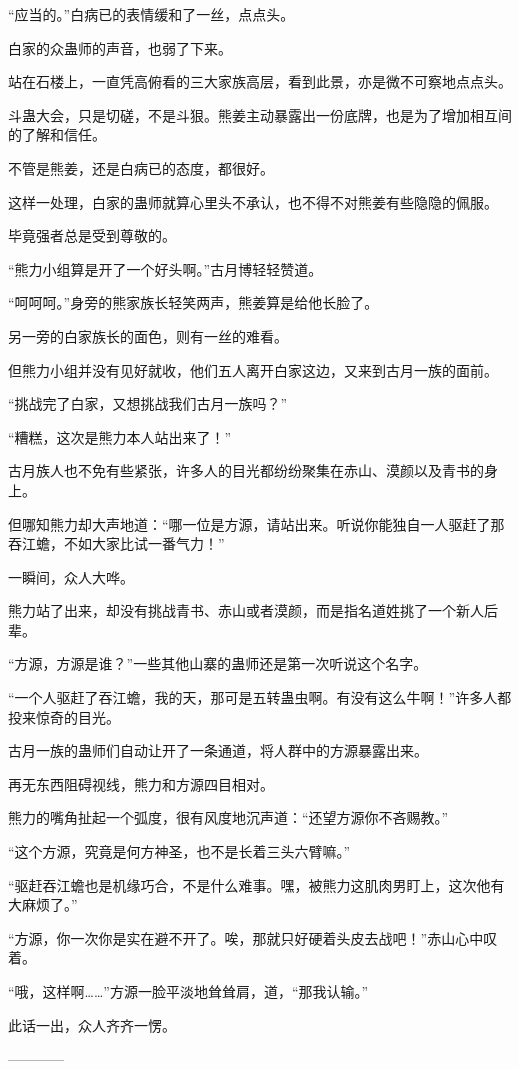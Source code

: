 \begin{this_body}
“应当的。”白病已的表情缓和了一丝，点点头。

白家的众蛊师的声音，也弱了下来。

站在石楼上，一直凭高俯看的三大家族高层，看到此景，亦是微不可察地点点头。

斗蛊大会，只是切磋，不是斗狠。熊姜主动暴露出一份底牌，也是为了增加相互间的了解和信任。

不管是熊姜，还是白病已的态度，都很好。

这样一处理，白家的蛊师就算心里头不承认，也不得不对熊姜有些隐隐的佩服。

毕竟强者总是受到尊敬的。

“熊力小组算是开了一个好头啊。”古月博轻轻赞道。

“呵呵呵。”身旁的熊家族长轻笑两声，熊姜算是给他长脸了。

另一旁的白家族长的面色，则有一丝的难看。

但熊力小组并没有见好就收，他们五人离开白家这边，又来到古月一族的面前。

“挑战完了白家，又想挑战我们古月一族吗？”

“糟糕，这次是熊力本人站出来了！”

古月族人也不免有些紧张，许多人的目光都纷纷聚集在赤山、漠颜以及青书的身上。

但哪知熊力却大声地道：“哪一位是方源，请站出来。听说你能独自一人驱赶了那吞江蟾，不如大家比试一番气力！”

一瞬间，众人大哗。

熊力站了出来，却没有挑战青书、赤山或者漠颜，而是指名道姓挑了一个新人后辈。

“方源，方源是谁？”一些其他山寨的蛊师还是第一次听说这个名字。

“一个人驱赶了吞江蟾，我的天，那可是五转蛊虫啊。有没有这么牛啊！”许多人都投来惊奇的目光。

古月一族的蛊师们自动让开了一条通道，将人群中的方源暴露出来。

再无东西阻碍视线，熊力和方源四目相对。

熊力的嘴角扯起一个弧度，很有风度地沉声道：“还望方源你不吝赐教。”

“这个方源，究竟是何方神圣，也不是长着三头六臂嘛。”

“驱赶吞江蟾也是机缘巧合，不是什么难事。嘿，被熊力这肌肉男盯上，这次他有大麻烦了。”

“方源，你一次你是实在避不开了。唉，那就只好硬着头皮去战吧！”赤山心中叹着。

“哦，这样啊……”方源一脸平淡地耸耸肩，道，“那我认输。”

此话一出，众人齐齐一愣。

------------

\end{this_body}

